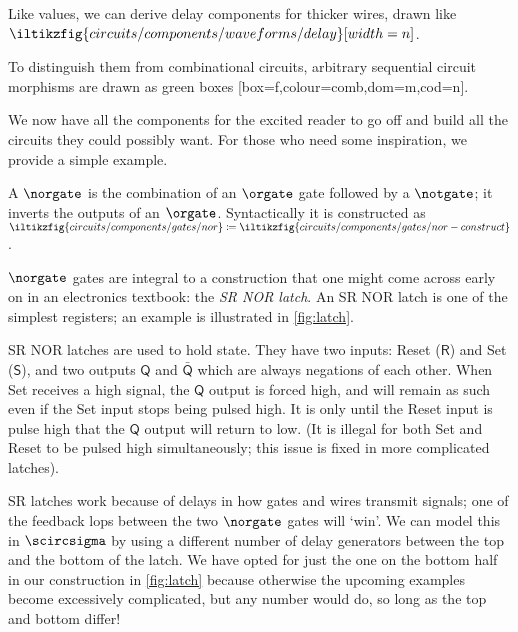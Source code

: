 \begin{notation}
    Like values, we can derive delay components for thicker wires, drawn like
    \(
        \iltikzfig{circuits/components/waveforms/delay}[width=n]
    \).
\end{notation}

To distinguish them from combinational circuits, arbitrary sequential circuit
morphisms are drawn as green boxes [box=f,colour=comb,dom=m,cod=n].

We now have all the components for the excited reader to go off and build
all the circuits they could possibly want.
For those who need some inspiration, we provide a simple example.

\begin{example}[SR latch]\label{ex:sr-latch}
    A \(\norgate\) is the combination of an \(\orgate\) gate followed by a
    \(\notgate\); it inverts the outputs of an \(\orgate\).
    Syntactically it is constructed as \(
        \iltikzfig{circuits/components/gates/nor}
        \coloneqq
        \iltikzfig{circuits/components/gates/nor-construct}
    \).

    \(\norgate\) gates are integral to a construction that one might come across
    early on in an electronics textbook: the \emph{SR NOR latch}.
    An SR NOR latch is one of the simplest registers; an example is illustrated
    in \cref{fig:latch}.

    SR NOR latches are used to hold state.
    They have two inputs: Reset (\(\mathsf{R}\)) and Set (\(\mathsf{S}\)), and
    two outputs \(\mathsf{Q}\) and \(\bar{\mathsf{Q}}\) which are always
    negations of each other.
    When Set receives a high signal, the \(\mathsf{Q}\) output is forced high,
    and will remain as such even if the Set input stops being pulsed high.
    It is only until the Reset input is pulse high that the \(\mathsf{Q}\)
    output will return to low.
    (It is illegal for both Set and Reset to be pulsed high simultaneously; this
    issue is fixed in more complicated latches).

    SR latches work because of delays in how gates and wires transmit signals;
    one of the feedback lops between the two \(\norgate\) gates will `win'.
    We can model this in \(\scircsigma\) by using a different number of delay
    generators between the top and the bottom of the latch.
    We have opted for just the one on the bottom half in our construction in
    \cref{fig:latch}
    because otherwise the upcoming examples become excessively complicated, but
    any number would do, so long as the top and bottom differ!
\end{example}

